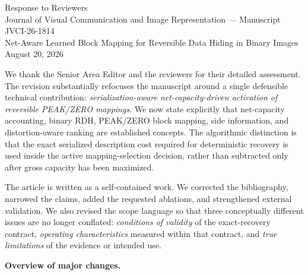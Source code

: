 \documentclass[11pt]{article}
\begin{document}
\begin{center}
{\LARGE Response to Reviewers}\\[6pt]
{\large Journal of Visual Communication and Image Representation --- Manuscript JVCI-26-1814}\\[6pt]
{\large Net-Aware Learned Block Mapping for Reversible Data Hiding in Binary Images}\\[18pt]
August 20, 2026
\end{center}

We thank the Senior Area Editor and the reviewers for their detailed assessment. The revision substantially refocuses the manuscript around a single defensible technical contribution: \emph{serialization-aware net-capacity-driven activation of reversible PEAK/ZERO mappings}. We now state explicitly that net-capacity accounting, binary RDH, PEAK/ZERO block mapping, side information, and distortion-aware ranking are established concepts. The algorithmic distinction is that the exact serialized description cost required for deterministic recovery is used inside the active mapping-selection decision, rather than subtracted only after gross capacity has been maximized.

The article is written as a self-contained work. We corrected the bibliography, narrowed the claims, added the requested ablations, and strengthened external validation. We also revised the scope language so that three conceptually different issues are no longer conflated: \emph{conditions of validity} of the exact-recovery contract, \emph{operating characteristics} measured within that contract, and \emph{true limitations} of the evidence or intended use.

\textbf{Overview of major changes.}
\end{document}
